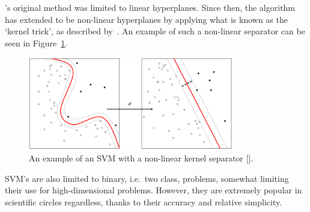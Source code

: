 \citeauthor{vapnik1995support}'s original method was limited to linear hyperplanes. Since then, the algorithm has extended to be non-linear hyperplanes by applying what is known as the `kernel trick', as described by~\cite{amari1999improving}. An example of such a non-linear separator can be seen in Figure~\ref{fig:chap2-svm-nonlinear}.

\begin{figure}
  \centering
  \includegraphics[width=0.8\textwidth]{figures/chapter2/svm_nonlinear}
  \caption[An example of an SVM with a non-linear kernel separator.]{An example of an SVM with a non-linear kernel separator [\cite{kernel-wiki-pic}].}
\label{fig:chap2-svm-nonlinear}
\end{figure}

SVM's are also limited to  binary, i.e.\ two class, problems, somewhat limiting their use for high-dimensional problems. However, they are extremely popular in scientific circles regardless,  thanks to their accuracy and relative simplicity. 

